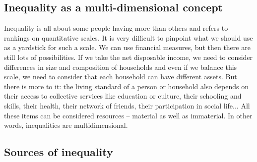 \documentclass[../summary.tex]{subfiles}
\begin{document}
	\subsection{Inequality as a multi-dimensional concept}
	
	Inequality is all about some people having more than others and refers to rankings on quantitative scales. It is very difficult to pinpoint what we should use as a yardstick for such a scale. We can use financial measures, but then there are still lots of possibilities. If we take the net disposable income, we need to consider differences in size and composition of households and even if we balance this scale, we need to consider that each household can have different assets. But there is more to it: the living standard of a person or household also depends on their access to collective services like education or culture, their schooling and skills, their health, their network of friends, their participation in social life... All these items can be considered resources – material as well as immaterial. In other words, inequalities are multidimensional.
	
	\subsection{Sources of inequality}
	
\end{document}

